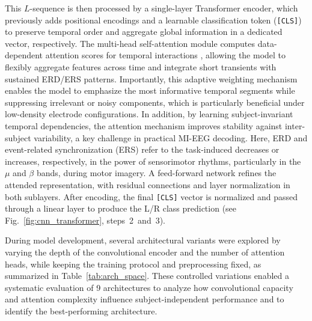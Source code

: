 \documentclass[a4paper,fleqn]{cas-dc}
\begin{document}
This $L$-sequence is then processed by a single-layer Transformer encoder, which previously adds positional encodings and a learnable classification token (\texttt{[CLS]}) to preserve temporal order and aggregate global information in a dedicated vector, respectively. 
The multi-head self-attention module computes data-dependent attention scores for temporal interactions \citep{vaswani2017attention}, allowing the model to flexibly aggregate features across time and integrate short transients with sustained ERD/ERS patterns. Importantly, this adaptive weighting mechanism enables the model to emphasize the most informative temporal segments while suppressing irrelevant or noisy components, which is particularly beneficial under low-density electrode configurations. In addition, by learning subject-invariant temporal dependencies, the attention mechanism improves stability against inter-subject variability, a key challenge in practical MI-EEG decoding. Here, ERD and event-related synchronization (ERS) refer to the task-induced decreases or increases, respectively, in the power of sensorimotor rhythms, particularly in the $\mu$ and $\beta$ bands, during motor imagery. A feed-forward network refines the attended representation, with residual connections and layer normalization in both sublayers. After encoding, the final \texttt{[CLS]} vector is normalized and passed through a linear layer to produce the L/R class prediction (see Fig.~\ref{fig:cnn_transformer}, steps~2~and~3).

During model development, several architectural variants were explored by varying the depth of the convolutional encoder and the number of attention heads, while keeping the training protocol and preprocessing fixed, as summarized in Table~\ref{tab:arch_space}. These controlled variations enabled a systematic evaluation of 9 architectures to analyze how convolutional capacity and attention complexity influence subject-independent performance and to identify the best-performing architecture.
\end{document}
